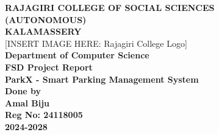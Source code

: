 \begin{titlepage}
    \centering
    
    {\fontsize{18pt}{22pt}\selectfont \textbf{RAJAGIRI COLLEGE OF SOCIAL SCIENCES}}\\[0.2cm]
    {\fontsize{16pt}{20pt}\selectfont \textbf{(AUTONOMOUS)}}\\[0.2cm]
    {\fontsize{16pt}{20pt}\selectfont \textbf{KALAMASSERY}}\\[1.5cm]
    
    [INSERT IMAGE HERE: Rajagiri College Logo]\\[1.5cm]
    
    {\fontsize{16pt}{20pt}\selectfont \textbf{Department of Computer Science}}\\[1cm]
    
    {\fontsize{18pt}{22pt}\selectfont \textbf{FSD Project Report}}\\[1cm]
    
    {\fontsize{20pt}{24pt}\selectfont \textbf{ParkX - Smart Parking Management System}}\\[2cm]
    
    {\fontsize{16pt}{20pt}\selectfont \textbf{Done by}}\\[0.2cm]
    {\fontsize{18pt}{22pt}\selectfont \textbf{Amal Biju}}\\[0.2cm]
    {\fontsize{16pt}{20pt}\selectfont \textbf{Reg No: 24118005}}\\[2cm]
    
    {\fontsize{16pt}{20pt}\selectfont \textbf{2024-2028}}
\end{titlepage}
